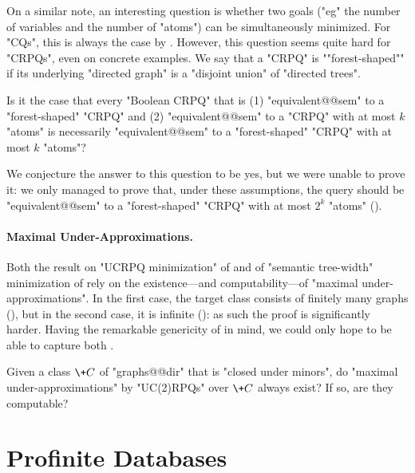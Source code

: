 On a similar note, an interesting question is whether two goals
("eg" the number of variables and the number of "atoms")
can be simultaneously minimized.
For "CQs", this is always the case by . However, this question
seems quite hard for "CRPQs", even on concrete examples.
We say that a "CRPQ" is ""forest-shaped"" if its underlying "directed graph"
is a "disjoint union" of "directed trees".
\begin{question}
	Is it the case that every "Boolean CRPQ" that is (1) "equivalent@@sem" to
	a "forest-shaped" "CRPQ" and (2) "equivalent@@sem" to a "CRPQ"
  with at most $k$ "atoms" is necessarily "equivalent@@sem" to a 
  "forest-shaped" "CRPQ" with at most $k$ "atoms"?
\end{question}
We conjecture the answer to this question to be yes, but we were unable to prove it:
we only managed to prove that, under these assumptions, the query
should be "equivalent@@sem" to a "forest-shaped" "CRPQ" with at most $2^k$ "atoms"
().


\paragraph*{Maximal Under-Approximations.}
Both the result on "UCRPQ minimization" of 
and of "semantic tree-width" minimization of  
rely on the existence---and computability---of "maximal under-approximations".
In the first case, the target class consists of finitely many graphs (), but in the second case,
it is infinite (): as such the proof is significantly harder.
Having the remarkable genericity of  in mind,
we could only hope to be able to capture 
both .

\begin{question}
	Given a class $\+C$ of "graphs@@dir" that is "closed under minors",
	do "maximal under-approximations" by "UC(2)RPQs" over $\+C$ always exist?
	If so, are they computable?
\end{question}

\section{Profinite Databases}

